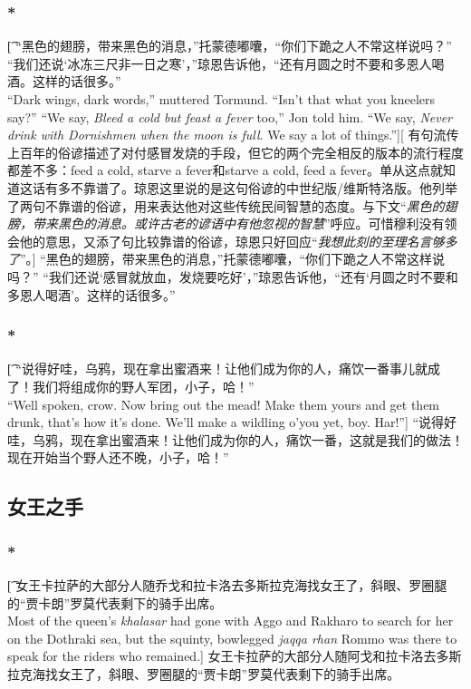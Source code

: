 \documentclass[12pt,a4paper]{article}
\begin{document}
\subsubsection{\color{red}*}\t[
	“黑色的翅膀，带来黑色的消息，”托蒙德嘟囔，“你们下跪之人不常这样说吗？”
	“我们还说‘冰冻三尺非一日之寒’，”琼恩告诉他，“还有月圆之时不要和多恩人喝酒。这样的话很多。”\\
	“Dark wings, dark words,” muttered Tormund. “Isn't that what you kneelers say?”
	“We say, \emph{Bleed a cold but feast a fever} too,” Jon told him. “We say, \emph{Never drink with Dornishmen when the moon is full}. We say a lot of things.”][
	有句流传上百年的俗谚描述了对付感冒发烧的手段，但它的两个完全相反的版本的流行程度都差不多：feed a cold, starve a fever和starve a cold, feed a fever。单从这点就知道这话有多不靠谱了。琼恩这里说的是这句俗谚的中世纪版/维斯特洛版。他列举了两句不靠谱的俗谚，用来表达他对这些传统民间智慧的态度。与下文“\emph{黑色的翅膀，带来黑色的消息。或许古老的谚语中有他忽视的智慧}”呼应。可惜穆利没有领会他的意思，又添了句比较靠谱的俗谚，琼恩只好回应“\emph{我想此刻的至理名言够多了}”。]
	“黑色的翅膀，带来黑色的消息，”托蒙德嘟囔，“你们下跪之人不常这样说吗？”
	“我们还说‘感冒就放血，发烧要吃好’，”琼恩告诉他，“还有‘月圆之时不要和多恩人喝酒’。这样的话很多。”

\subsubsection{\color{red}*}\t[
	“说得好哇，乌鸦，现在拿出蜜酒来！让他们成为你的人，痛饮一番事儿就成了！我们将组成你的野人军团，小子，哈！”\\
	“Well spoken, crow. Now bring out the mead! Make them yours and get them drunk, that's how it's done. We'll make a wildling o'you yet, boy. Har!”]
	“说得好哇，乌鸦，现在拿出蜜酒来！让他们成为你的人，痛饮一番，这就是我们的做法！现在开始当个野人还不晚，小子，哈！”
	
\subsection{女王之手}
\subsubsection{\color{red}*}\t[
	女王卡拉萨的大部分人随乔戈和拉卡洛去多斯拉克海找女王了，斜眼、罗圈腿的“贾卡朗”罗莫代表剩下的骑手出席。\\
	Most of the queen's \emph{khalasar} had gone with Aggo and Rakharo to search for her on the Dothraki sea, but the squinty, bowlegged \emph{jaqqa rhan} Rommo was there to speak for the riders who remained.]
	女王卡拉萨的大部分人随阿戈和拉卡洛去多斯拉克海找女王了，斜眼、罗圈腿的“贾卡朗”罗莫代表剩下的骑手出席。
\end{document}

